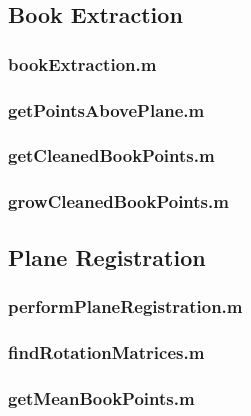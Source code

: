 \subsection{Book Extraction}\label{BookExtractionCode}

\subsubsection{bookExtraction.m}\label{bookExtractionCode}


\subsubsection{getPointsAbovePlane.m}\label{getPointsAbovePlane}


\subsubsection{getCleanedBookPoints.m}\label{getCleanedBookPoints}


\subsubsection{growCleanedBookPoints.m}\label{growCleanedBookPoints}


\subsection{Plane Registration} \label{PlaneRegistrationCode}

\subsubsection{performPlaneRegistration.m}\label{performPlaneRegistrationCode}


\subsubsection{findRotationMatrices.m}\label{findRotationMatricesCode}


\subsubsection{getMeanBookPoints.m}\label{getMeanBookPointsCode}


